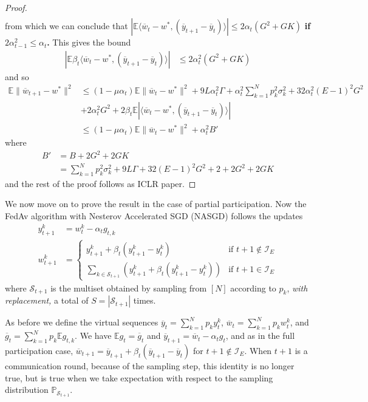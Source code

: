 \begin{proof}
\begin{align*}
	\end{align*}
	from which we can conclude that $|\mathbb{E}\langle\overline{w}_{t}-w^{\ast},(\overline{y}_{t+1}-\overline{y}_{t})\rangle|\leq2\alpha_{t}(G^{2}+GK)$\textbf{
		if $2\alpha_{t-1}^{2}\leq\alpha_{t}$.} This gives the bound
	\begin{align*}
	|\mathbb{E}\beta_{t}\langle\overline{w}_{t}-w^{\ast},(\overline{y}_{t+1}-\overline{y}_{t})\rangle| & \leq2\alpha_{t}^{2}(G^{2}+GK)
	\end{align*}
	and so
	\begin{align*}
	\mathbb{E}\|\overline{w}_{t+1}-w^{\ast}\|^{2} & \leq(1-\mu\alpha_{t})\mathbb{E}\|\overline{w}_{t}-w^{\ast}\|^{2}+9L\alpha_{t}^{2}\Gamma+\alpha_{t}^{2}\sum_{k=1}^{N}p_{k}^{2}\sigma_{k}^{2}+32\alpha_{t}^{2}(E-1)^{2}G^{2}\\
	& +2\alpha_{t}^{2}G^{2}+2\beta_{t}\mathbb{E}|\langle\overline{w}_{t}-w^{\ast},(\overline{y}_{t+1}-\overline{y}_{t})\rangle|\\
	& \leq(1-\mu\alpha_{t})\mathbb{E}\|\overline{w}_{t}-w^{\ast}\|^{2}+\alpha_{t}^{2}B'
	\end{align*}
	where 
	\begin{align*}
	B' & =B+2G^{2}+2GK\\
	& =\sum_{k=1}^{N}p_{k}^{2}\sigma_{k}^{2}+9L\Gamma+32(E-1)^{2}G^{2}+2+2G^{2}+2GK
	\end{align*}
	and the rest of the proof follows as ICLR paper. 
\end{proof}
%
We now move on to prove the result in the case of partial participation.
Now the FedAv algorithm with Nesterov Accelerated SGD (NASGD) follows
the updates
\begin{align*}
y_{t+1}^{k} & =w_{t}^{k}-\alpha_{t}g_{t,k}\\
w_{t+1}^{k} & =\begin{cases}
y_{t+1}^{k}+\beta_{t}(y_{t+1}^{k}-y_{t}^{k}) & \text{if }t+1\notin\mathcal{I}_{E}\\
\sum_{k\in\mathcal{S}_{t+1}}\left(y_{t+1}^{k}+\beta_{t}(y_{t+1}^{k}-y_{t}^{k})\right) & \text{if }t+1\in\mathcal{I}_{E}
\end{cases}
\end{align*}
where $\mathcal{S}_{t+1}$ is the multiset obtained by sampling from
$[N]$ according to $p_{k}$, \emph{with replacement, }a total of
$S=|\mathcal{S}_{t+1}|$ times. 

As before we define the virtual sequences $\overline{y}_{t}=\sum_{k=1}^{N}p_{k}y_{t}^{k}$,
$\overline{w}_{t}=\sum_{k=1}^{N}p_{k}w_{t}^{k}$, and $\overline{g}_{t}=\sum_{k=1}^{N}p_{k}\mathbb{E}g_{t,k}$.
We have $\mathbb{E}g_{t}=\overline{g}_{t}$ and $\overline{y}_{t+1}=\overline{w}_{t}-\alpha_{t}g_{t}$,
and as in the full participation case, $\overline{w}_{t+1}=\overline{y}_{t+1}+\beta_{t}(\overline{y}_{t+1}-\overline{y}_{t})$
for $t+1\notin\mathcal{I}_{E}$. When $t+1$ is a communication round,
because of the sampling step, this identity is no longer true, but
is true when we take expectation with respect to the sampling distribution
$\mathbb{P}_{\mathcal{S}_{t+1}}$. 


